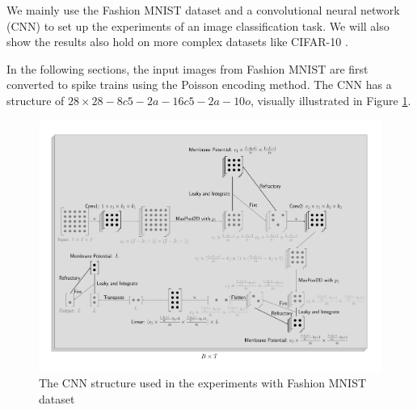 
    We mainly use the Fashion MNIST dataset \cite{xiao2017/online} and a convolutional neural network (CNN) \cite{726791} to set up the experiments of an image classification task. We will also show the results also hold on more complex datasets like CIFAR-10 \cite{Krizhevsky2009}. 

    In the following sections, the input images from Fashion MNIST are first converted to spike trains using the Poisson encoding method. The CNN has a structure of $28\times 28 - 8c5 - 2a - 16c5 - 2a - 10o$, visually illustrated in Figure \ref{fig:scnn_structure}. 

    \begin{figure}[!htpb]
        \centering
        \includegraphics[width=\textwidth]{assets/standard/FashionMNIST/snn2.pdf}
        \caption{The CNN structure used in the experiments with Fashion MNIST dataset}
        \label{fig:scnn_structure}
    \end{figure}

